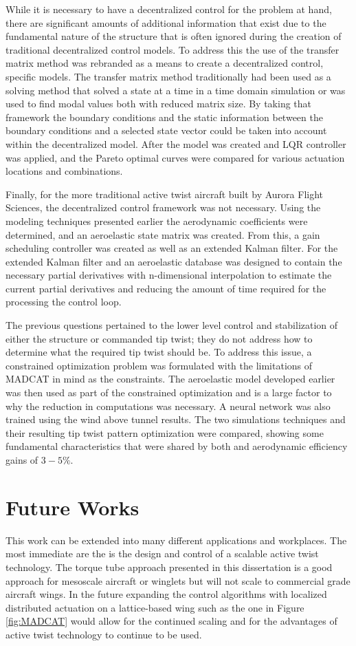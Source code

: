 \documentclass[11pt]{ucthesis}
\begin{document}
While it is necessary to have a decentralized control for the problem at hand, there are significant amounts of additional information that exist due to the fundamental nature of the structure that is often ignored during the creation of traditional decentralized control models. To address this the use of the transfer matrix method was rebranded as a means to create a decentralized control, specific models. The transfer matrix method traditionally had been used as a solving method that solved a state at a time in a time domain simulation or was used to find modal values both with reduced matrix size. By taking that framework the boundary conditions and the static information between the boundary conditions and a selected state vector could be taken into account within the decentralized model. After the model was created and LQR controller was applied, and the Pareto optimal curves were compared for various actuation locations and combinations. 

Finally, for the more traditional active twist aircraft built by Aurora Flight Sciences, the decentralized control framework was not necessary. Using the modeling techniques presented earlier the aerodynamic coefficients were determined, and an aeroelastic state matrix was created. From this, a gain scheduling controller was created as well as an extended Kalman filter. For the extended Kalman filter and an aeroelastic database was designed to contain the necessary partial derivatives with n-dimensional interpolation to estimate the current partial derivatives and reducing the amount of time required for the processing the control loop.

The previous questions pertained to the lower level control and stabilization of either the structure or commanded tip twist; they do not address how to determine what the required tip twist should be. To address this issue, a constrained optimization problem was formulated with the limitations of MADCAT in mind as the constraints. The aeroelastic model developed earlier was then used as part of the constrained optimization and is a large factor to why the reduction in computations was necessary. A neural network was also trained using the wind above tunnel results. The two simulations techniques and their resulting tip twist pattern optimization were compared, showing some fundamental characteristics that were shared by both and aerodynamic efficiency gains of $3-5\%$.

\section{Future Works}
This work can be extended into many different applications and workplaces. The most immediate are the is the design and control of a scalable active twist technology. The torque tube approach presented in this dissertation is a good approach for mesoscale aircraft or winglets but will not scale to commercial grade aircraft wings. In the future expanding the control algorithms with localized distributed actuation on a lattice-based wing such as the one in Figure \ref{fig:MADCAT} would allow for the continued scaling and for the advantages of active twist technology to continue to be used.
\end{document}
